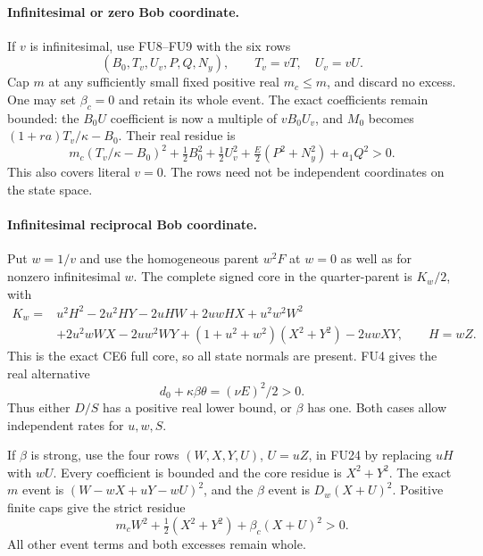 \paragraph{Infinitesimal or zero Bob coordinate.}
If $v$ is infinitesimal, use FU8--FU9 with the six rows
\[
 (B_0,T_v,U_v,P,Q,N_y),\qquad T_v=vT,\quad U_v=vU.
 \tag{FU22}
\]
Cap $m$ at any sufficiently small fixed positive real $m_c\le m$,
and discard no excess. One may set $\beta_c=0$ and retain its
whole event. The exact coefficients remain bounded: the $B_0U$
coefficient is now a multiple of $vB_0U_v$, and $M_0$ becomes
$(1+ra)T_v/\kappa-B_0$. Their real residue is
\[
 m_c(T_v/\kappa-B_0)^2+\tfrac12B_0^2+\tfrac12U_v^2
                      +\tfrac E2(P^2+N_y^2)+a_1Q^2>0.
 \tag{FU23}
\]
This also covers literal $v=0$. The rows need not be independent
coordinates on the state space.

\paragraph{Infinitesimal reciprocal Bob coordinate.}
Put $w=1/v$ and use the homogeneous parent $w^2F$ at $w=0$ as
well as for nonzero infinitesimal $w$. The complete signed core
in the quarter-parent is $K_w/2$, with
\[
\begin{split}
 K_w={}&u^2H^2-2u^2HY-2uHW+2uwHX+u^2w^2W^2\\
 &+2u^2wWX-2uw^2WY+(1+u^2+w^2)(X^2+Y^2)-2uwXY,
 \qquad H=wZ.
\end{split}\tag{FU24}
\]
This is the exact CE6 full core, so all state normals are present.
FU4 gives the real alternative
\[
 d_0+\kappa\beta\theta=(\nu E)^2/2>0.
 \tag{FU25}
\]
Thus either $D/S$ has a positive real lower bound, or $\beta$
has one. Both cases allow independent rates for $u,w,S$.

If $\beta$ is strong, use the four rows $(W,X,Y,U)$, $U=uZ$,
in FU24 by replacing $uH$ with $wU$. Every coefficient is bounded
and the core residue is $X^2+Y^2$. The exact $m$ event is
$(W-wX+uY-wU)^2$, and the $\beta$ event is
$D_w(X+U)^2$. Positive finite caps give the strict residue
\[
 m_cW^2+\tfrac12(X^2+Y^2)+\beta_c(X+U)^2>0.
 \tag{FU26}
\]
All other event terms and both excesses remain whole.


